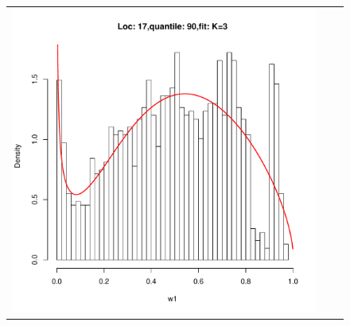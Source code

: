 \begin{figure}[h]
\begin{tabular}{ccc}
\includegraphics[width=\textwidth/3]{../img/loc17/quantile90/fit_K3.pdf}\\



\end{tabular}
\end{figure}
